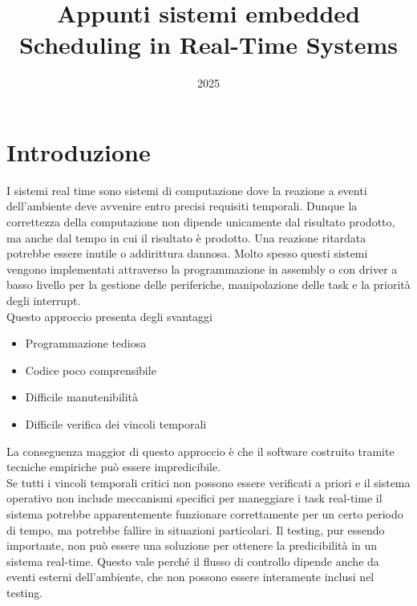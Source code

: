 \documentclass[12pt]{article}
\title{Appunti sistemi embedded \\ Scheduling in Real-Time Systems}
\author{}
\date{2025}
\begin{document}
\maketitle
\tableofcontents
\newpage
\section{Introduzione}

I sistemi real time sono sistemi di computazione dove la reazione a eventi dell'ambiente deve avvenire entro precisi requisiti temporali.
Dunque la correttezza della computazione non dipende unicamente dal risultato prodotto, ma anche dal tempo in cui il risultato è prodotto.
Una reazione ritardata potrebbe essere inutile o addirittura dannosa.
Molto spesso questi sistemi vengono implementati attraverso la programmazione in assembly o con driver a basso livello per la gestione delle periferiche, manipolazione delle task 
e la priorità degli interrupt.
\\
Questo approccio presenta degli svantaggi
\begin{itemize}
    \item Programmazione tediosa
    \item Codice poco comprensibile
    \item Difficile manutenibilità
    \item Difficile verifica dei vincoli temporali
\end{itemize}
La conseguenza maggior di questo approccio è che il software costruito tramite tecniche empiriche può  essere impredicibile.\\
Se tutti i vincoli temporali critici non possono essere verificati a priori e il sistema operativo non include meccanismi specifici per maneggiare i task real-time
il sistema potrebbe apparentemente funzionare correttamente per un certo periodo di tempo, ma potrebbe fallire in situazioni particolari.
Il testing, pur essendo importante, non può essere una soluzione per ottenere la predicibilità in un sistema real-time. Questo vale perché 
il flusso di controllo dipende anche da eventi esterni dell'ambiente, che non possono essere interamente inclusi nel testing.
\end{document}
